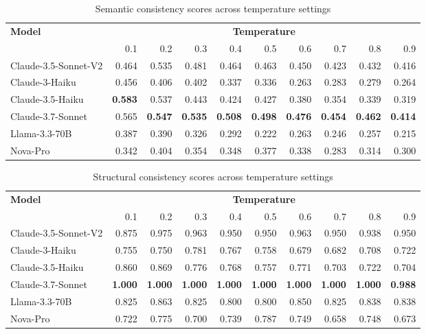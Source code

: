 \documentclass{article}
\begin{document}
\begin{table}[H]
\centering
\caption{Semantic consistency scores across temperature settings}
\label{tab:semantic-consistency-temp}
\begin{tabular}{lrrrrrrrrr}
\toprule
\textbf{Model} & \multicolumn{9}{c}{\textbf{Temperature}} \\
\cmidrule{2-10}
 & 0.1 & 0.2 & 0.3 & 0.4 & 0.5 & 0.6 & 0.7 & 0.8 & 0.9 \\
\midrule
Claude-3.5-Sonnet-V2 & 0.464 & 0.535 & 0.481 & 0.464 & 0.463 & 0.450 & 0.423 & 0.432 & 0.416 \\
Claude-3-Haiku & 0.456 & 0.406 & 0.402 & 0.337 & 0.336 & 0.263 & 0.283 & 0.279 & 0.264 \\
Claude-3.5-Haiku & \textbf{0.583} & 0.537 & 0.443 & 0.424 & 0.427 & 0.380 & 0.354 & 0.339 & 0.319 \\
Claude-3.7-Sonnet & 0.565 & \textbf{0.547} & \textbf{0.535} & \textbf{0.508} & \textbf{0.498} & \textbf{0.476} & \textbf{0.454} & \textbf{0.462} & \textbf{0.414} \\
Llama-3.3-70B & 0.387 & 0.390 & 0.326 & 0.292 & 0.222 & 0.263 & 0.246 & 0.257 & 0.215 \\
Nova-Pro & 0.342 & 0.404 & 0.354 & 0.348 & 0.377 & 0.338 & 0.283 & 0.314 & 0.300 \\
\bottomrule
\end{tabular}
\end{table}

\begin{table}[H]
\centering
\caption{Structural consistency scores across temperature settings}
\label{tab:structural-consistency-temp}
\begin{tabular}{lrrrrrrrrr}
\toprule
\textbf{Model} & \multicolumn{9}{c}{\textbf{Temperature}} \\
\cmidrule{2-10}
 & 0.1 & 0.2 & 0.3 & 0.4 & 0.5 & 0.6 & 0.7 & 0.8 & 0.9 \\
\midrule
Claude-3.5-Sonnet-V2 & 0.875 & 0.975 & 0.963 & 0.950 & 0.950 & 0.963 & 0.950 & 0.938 & 0.950 \\
Claude-3-Haiku & 0.755 & 0.750 & 0.781 & 0.767 & 0.758 & 0.679 & 0.682 & 0.708 & 0.722 \\
Claude-3.5-Haiku & 0.860 & 0.869 & 0.776 & 0.768 & 0.757 & 0.771 & 0.703 & 0.722 & 0.704 \\
Claude-3.7-Sonnet & \textbf{1.000} & \textbf{1.000} & \textbf{1.000} & \textbf{1.000} & \textbf{1.000} & \textbf{1.000} & \textbf{1.000} & \textbf{1.000} & \textbf{0.988} \\
Llama-3.3-70B & 0.825 & 0.863 & 0.825 & 0.800 & 0.800 & 0.850 & 0.825 & 0.838 & 0.838 \\
Nova-Pro & 0.722 & 0.775 & 0.700 & 0.739 & 0.787 & 0.749 & 0.658 & 0.748 & 0.673 \\
\bottomrule
\end{tabular}
\end{table}
\end{document}
